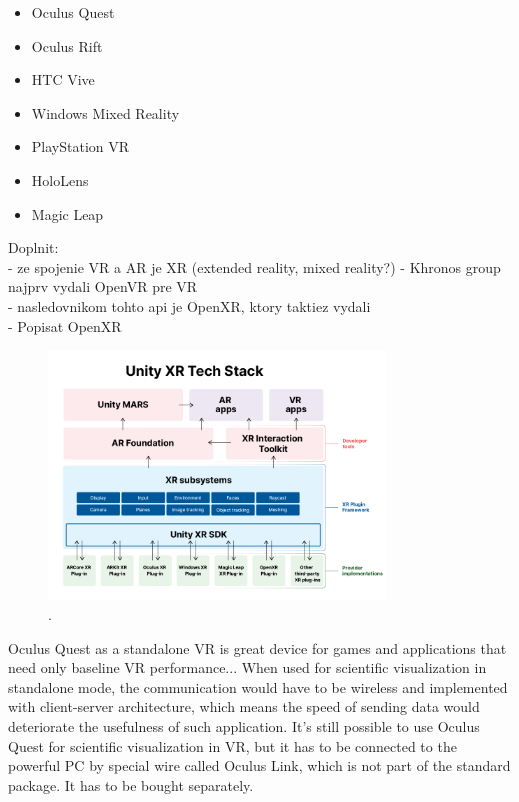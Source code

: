 \begin{itemize}
	\item Oculus Quest
	\item Oculus Rift
	\item HTC Vive
	\item Windows Mixed Reality
	\item PlayStation VR
	\item HoloLens
	\item Magic Leap
\end{itemize}

Doplnit:\\
- ze spojenie VR a AR je XR (extended reality, mixed reality?)
- Khronos group najprv vydali OpenVR pre VR \\
- nasledovnikom tohto api je OpenXR, ktory taktiez vydali \\
- Popisat OpenXR

\begin{figure}[!ht]
	\centering
	\includegraphics[width=0.8\textwidth]{figures/unity-xr-tech-stack.png}
	\caption{.}
	\label{fig:unity-xr-tech-stack}
\end{figure}

Oculus Quest as a standalone VR is great device for games and applications that need only baseline VR performance... When used for scientific visualization in standalone mode, the communication would have to be wireless and implemented with client-server architecture, which means the speed of sending data would deteriorate the usefulness of such application. It's still possible to use Oculus Quest for scientific visualization in VR, but it has to be connected to the powerful PC by special wire called Oculus Link, which is not part of the standard package. It has to be bought separately.

